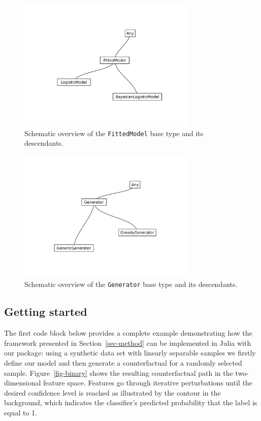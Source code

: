 \documentclass[
  letterpaper,
  DIV=11,
  numbers=noendperiod]{scrartcl}
\begin{document}
\begin{figure}

{\centering \includegraphics[width=3.33333in,height=2.5in]{www/models.png}

}

\caption{\label{fig-models}Schematic overview of the
\texttt{FittedModel} base type and its descendants.}

\end{figure}

\begin{figure}

{\centering \includegraphics[width=3.33333in,height=2.5in]{www/generators.png}

}

\caption{\label{fig-generators}Schematic overview of the
\texttt{Generator} base type and its descendants.}

\end{figure}

\hypertarget{sec-start}{%
\subsection{Getting started}\label{sec-start}}

The first code block below provides a complete example demonstrating how
the framework presented in Section~\ref{sec-method} can be implemented
in Julia with our package: using a synthetic data set with linearly
separable samples we firstly define our model and then generate a
counterfactual for a randomly selected sample. Figure~\ref{fig-binary}
shows the resulting counterfactual path in the two-dimensional feature
space. Features go through iterative perturbations until the desired
confidence level is reached as illustrated by the contour in the
background, which indicates the classifier's predicted probability that
the label is equal to 1.
\end{document}
